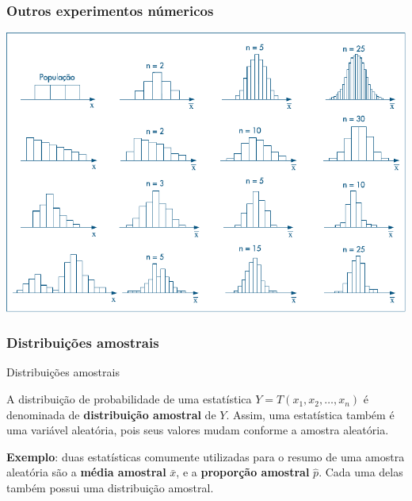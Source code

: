 \documentclass[11pt]{beamer}
\begin{document}
\begin{frame}
\frametitle{Outros experimentos númericos}
\begin{center}\includegraphics[width=0.9\linewidth]{figs/func2}\end{center}
\end{frame}

\begin{frame}
\frametitle{Distribuições amostrais}

\begin{block}{Distribuições amostrais}

A distribuição de probabilidade de uma estatística
\(Y = T(x_1, x_2, \ldots, x_n)\) é denominada de \textbf{distribuição
amostral} de \(Y\). Assim, uma estatística também é uma variável
aleatória, pois seus valores mudam conforme a amostra aleatória.
\end{block}

\begin{block}{}
\textbf{Exemplo}: duas estatísticas comumente utilizadas para o resumo
de uma amostra aleatória são a \textbf{média amostral} \(\bar{x}\), e a
\textbf{proporção amostral} \(\hat{p}\). Cada uma delas também possui
uma distribuição amostral.
\end{block}
\end{frame}
\end{document}

